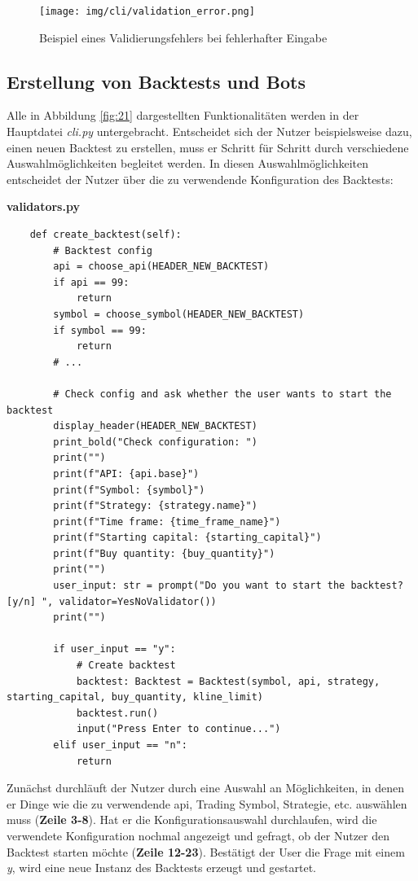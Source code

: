 \documentclass[oneside]{ausarbeitung}
\begin{document}
\begin{figure}[H]
  \centering
  \texttt{[image: img/cli/validation\_error.png]}
  \caption{Beispiel eines Validierungsfehlers bei fehlerhafter Eingabe}
  \label{fig:22}
\end{figure}

\subsection{Erstellung von Backtests und Bots}
\label{sub:erstellung_von_backtests_und_bots}

Alle in Abbildung \ref{fig:21} dargestellten Funktionalitäten werden in der Hauptdatei \textit{cli.py} untergebracht. Entscheidet sich der Nutzer beispielsweise dazu, einen neuen Backtest zu erstellen, muss er Schritt für Schritt durch verschiedene Auswahlmöglichkeiten begleitet werden. In diesen Auswahlmöglichkeiten entscheidet der Nutzer über die zu verwendende Konfiguration des Backtests:

\lstset{language=Python}
\lstset{frame=lines}
\lstset{basicstyle=\footnotesize}
\textbf{validators.py}
\begin{lstlisting}
	def create_backtest(self):
		# Backtest config
		api = choose_api(HEADER_NEW_BACKTEST)
		if api == 99:
			return
		symbol = choose_symbol(HEADER_NEW_BACKTEST)
		if symbol == 99:
			return
		# ...
		
		# Check config and ask whether the user wants to start the backtest
		display_header(HEADER_NEW_BACKTEST)
		print_bold("Check configuration: ")
		print("")
		print(f"API: {api.base}")
		print(f"Symbol: {symbol}")
		print(f"Strategy: {strategy.name}")
		print(f"Time frame: {time_frame_name}")
		print(f"Starting capital: {starting_capital}")
		print(f"Buy quantity: {buy_quantity}")
		print("")
		user_input: str = prompt("Do you want to start the backtest? [y/n] ", validator=YesNoValidator())
		print("")
        
		if user_input == "y":
			# Create backtest
			backtest: Backtest = Backtest(symbol, api, strategy, starting_capital, buy_quantity, kline_limit)
			backtest.run()
			input("Press Enter to continue...")
		elif user_input == "n":
			return
\end{lstlisting}

Zunächst durchläuft der Nutzer durch eine Auswahl an Möglichkeiten, in denen er Dinge wie die zu verwendende \ac{api}, Trading Symbol, Strategie, etc. auswählen muss (\textbf{Zeile 3-8}). Hat er die Konfigurationsauswahl durchlaufen, wird die verwendete Konfiguration nochmal angezeigt und gefragt, ob der Nutzer den Backtest starten möchte (\textbf{Zeile 12-23}). Bestätigt der User die Frage mit einem \textit{y}, wird eine neue Instanz des Backtests erzeugt und gestartet.
\end{document}
